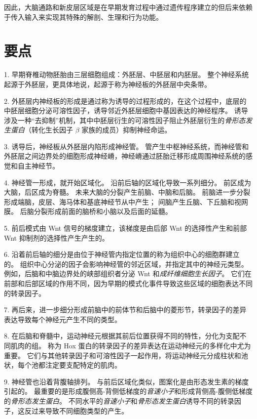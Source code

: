 因此，大脑通路和新皮层区域是在早期发育过程中通过遗传程序建立的但后来依赖于传入输入来实现其特殊的解剖、生理和行为功能。



\section{要点}

1. 早期脊椎动物胚胎由三层细胞组成：外胚层、中胚层和内胚层。
整个神经系统起源于外胚层，更具体地说，起源于称为神经板的外胚层中央条带。 


2. 外胚层内神经板的形成是通过称为诱导的过程形成的，在这个过程中，底层的中胚层细胞分泌可溶性因子，诱导邻近外胚层细胞中基因表达的神经程序。
诱导涉及一种“去抑制”机制，其中中胚层衍生的可溶性因子阻止外胚层衍生的\textit{骨形态发生蛋白}（转化生长因子 $\beta$ 家族的成员）抑制神经命运。 


3. 诱导后，神经板从外胚层内陷形成神经管。
管产生中枢神经系统，而神经管和外胚层之间边界处的细胞形成神经嵴，神经嵴通过胚胎迁移形成周围神经系统的感觉和自主神经节。


4. 神经管一形成，就开始区域化。
沿前后轴的区域化导致一系列细分。
前区成为大脑，后区成为脊髓。 未来大脑的分裂产生前脑、中脑和后脑。
前脑进一步分裂形成端脑，皮层、海马体和基底神经节从中产生；
间脑产生丘脑、下丘脑和视网膜。
后脑分裂形成前面的脑桥和小脑以及后面的延髓。


5. 前后模式由 Wnt 信号的梯度建立，该梯度是由后部 Wnt 的选择性产生和前部 Wnt 抑制剂的选择性产生产生的。


6. 沿着前后轴的细分是由位于神经管内指定位置的称为组织中心的细胞群建立的。
组织中心分泌的因子会影响神经管的邻近区域，并指定其中的神经元类型。
例如，后脑和中脑边界处的峡部组织者分泌 Wnt 和\textit{成纤维细胞生长因子}。
它们在前部和后部区域的作用不同，因为早期的模式化事件导致这些区域的细胞表达不同的转录因子。


7. 再后来，进一步细分形成前脑中的前体节和后脑中的菱形节，转录因子的差异表达导致每个神经元产生不同的类型。 


8. 在后脑和脊髓中，运动神经元根据其前后位置获得不同的特性，分化为支配不同肌肉的组。
称为 Hox 蛋白的转录因子的差异表达在运动神经元的多样化中尤为重要。
它们与其他转录因子和可溶性因子一起作用，将运动神经元分成柱状和池状，每个池都注定要支配特定的肌肉。 


9. 神经管也沿着背腹轴排列。
与前后区域化类似，图案化是由形态发生素的梯度引起的。
最重要的是形成腹侧高-背侧低梯度的\textit{音速小子}和形成背侧高-腹侧低梯度的\textit{骨形态发生蛋白}。
不同水平的\textit{音速小子}和\textit{骨形态发生蛋白}诱导不同的转录因子，这反过来导致不同细胞类型的产生。 


